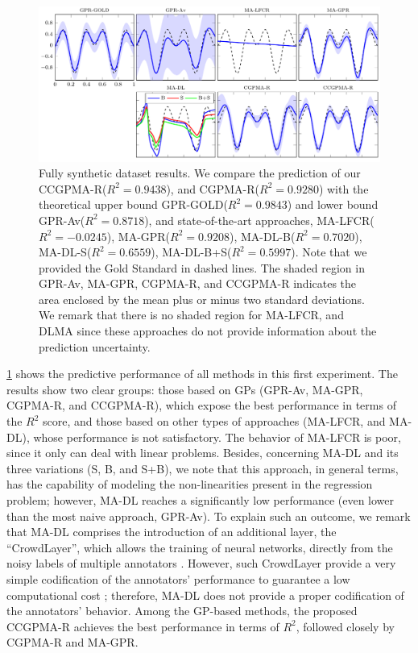 \documentclass[9pt]{article}
\begin{document}
\begin{figure}[!tb]
	\centering
% 	
	\includegraphics[width = \textwidth]{Figures/SinReg.pdf}
	\caption{Fully synthetic dataset results. We compare the prediction of our CCGPMA-R($R^2=0.9438$), and CGPMA-R($R^2=0.9280$) with the theoretical upper bound GPR-GOLD($R^2=0.9843$) and lower bound GPR-Av($R^2=0.8718$), and state-of-the-art approaches, MA-LFCR($R^2=-0.0245$), MA-GPR($R^2=0.9208$),  MA-DL-B($R^2=0.7020$), MA-DL-S($R^2=0.6559$), MA-DL-B+S($R^2=0.5997$). Note that we provided the Gold Standard in dashed lines. The shaded region in GPR-Av, MA-GPR, CGPMA-R, and CCGPMA-R indicates the area enclosed by the mean plus or minus two standard deviations. We remark that there is no shaded region for MA-LFCR, and DLMA since these approaches do not provide information about the prediction uncertainty.}
	\label{fig:FSReg}
\end{figure}
\cref{fig:FSReg} shows the predictive performance of all methods in this first experiment. The results show two clear groups: those based on GPs (GPR-Av, MA-GPR, CGPMA-R, and CCGPMA-R), which expose the best performance in terms of the $R^2$ score, and those based on other types of approaches (MA-LFCR, and MA-DL), whose performance is not satisfactory. The behavior of MA-LFCR is poor, since it only can deal with linear problems. Besides, concerning MA-DL and its three variations (S, B, and S+B), we note that this approach, in general terms, has the capability of modeling the non-linearities present in the regression problem; however, MA-DL reaches a significantly low performance (even lower than the most naive approach, GPR-Av). To explain such an outcome, we remark that MA-DL comprises the introduction of an additional layer, the ``CrowdLayer'', which allows the training of neural networks, directly from the noisy labels of multiple annotators \cite{rodrigues2018deep}. However, such CrowdLayer provide a very simple codification of the annotators' performance to guarantee a low computational cost \cite{morales2019scalable1}; therefore, MA-DL does not provide a proper codification of the annotators' behavior. Among the GP-based methods, the proposed CCGPMA-R achieves the best performance in terms of $R^2$, followed closely by  CGPMA-R and MA-GPR. 
\end{document}
